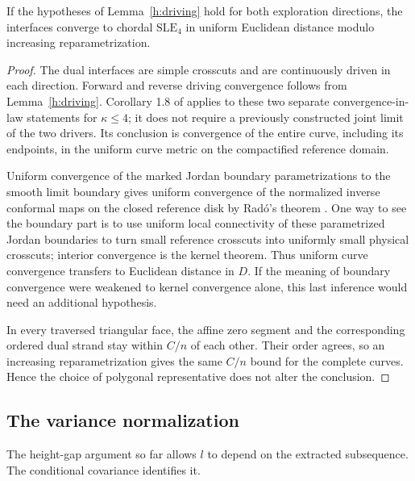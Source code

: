 \begin{proposition}
\label{h:uniform-path}
If the hypotheses of Lemma~\ref{h:driving} hold for both exploration
directions, the interfaces converge to chordal $\mathrm{SLE}_4$ in
uniform Euclidean distance modulo increasing reparametrization.
\end{proposition}
\begin{proof}
The dual interfaces are simple crosscuts and are continuously driven
in each direction. Forward and reverse driving convergence follows
from Lemma~\ref{h:driving}. Corollary 1.8 of \cite{SSun} applies to these
two separate convergence-in-law statements for $\kappa\le4$; it does
not require a previously constructed joint limit of the two drivers.
Its conclusion is convergence of the entire curve, including its
endpoints, in the uniform curve metric on the compactified reference
domain.

Uniform convergence of the marked Jordan boundary parametrizations
to the smooth limit boundary gives uniform convergence of the
normalized inverse conformal maps on the closed reference disk
by Rad\'o's theorem \cite[Section 1, p.~182]{Rado}.
One way to see the boundary part is to use uniform local connectivity
of these parametrized Jordan boundaries to turn small reference
crosscuts into uniformly small physical crosscuts; interior convergence
is the kernel theorem. Thus uniform curve convergence transfers to
Euclidean distance in $D$. If the meaning of boundary convergence
were weakened to kernel convergence alone, this last inference would
need an additional hypothesis.

In every traversed triangular face, the affine zero segment and the
corresponding ordered dual strand stay within $C/n$ of each other.
Their order agrees, so an increasing reparametrization gives the same
$C/n$ bound for the complete curves. Hence the choice of polygonal
representative does not alter the conclusion.
\end{proof}

\subsection{The variance normalization}

The height-gap argument so far allows $l$ to depend on the extracted
subsequence. The conditional covariance identifies it.

